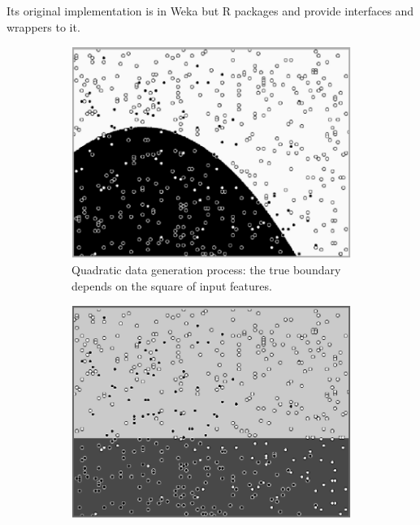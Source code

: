 Its original implementation is in Weka but \textsf{R} packages  and  provide interfaces and wrappers to it.

\begin{figure}[!htb]
{\setlength{\parindent}{0cm}}
\begin{center}
\centering
\begin{subfigure}[t]{0.25\textwidth}
\centering
\includegraphics[width=\textwidth]{figures/chapitre6/lmt_generation.png}
\caption{\label{fig:lmt1} Quadratic data generation process: the true boundary depends on the square of input features.}
\end{subfigure}%
\hspace*{1cm}
\begin{subfigure}[t]{0.25\textwidth}
\centering
\includegraphics[width=\textwidth]{figures/chapitre6/lmt_tree_1.png}

\end{subfigure}
\end{center}
\end{figure}
